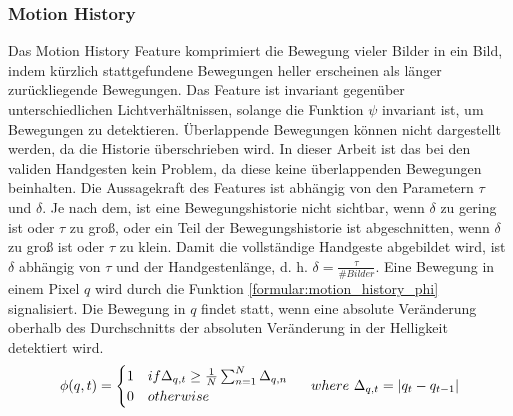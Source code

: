 \subsubsection{Motion History}
Das Motion History Feature komprimiert die Bewegung vieler Bilder in ein Bild, indem kürzlich stattgefundene Bewegungen heller erscheinen als länger zurückliegende Bewegungen. Das Feature ist invariant
gegenüber unterschiedlichen Lichtverhältnissen, solange die Funktion $\psi$ invariant ist, um Bewegungen zu detektieren. Überlappende Bewegungen können nicht dargestellt werden, da die Historie überschrieben
wird. In dieser Arbeit ist das bei den validen Handgesten kein Problem, da diese keine überlappenden Bewegungen beinhalten.
\newline
\newline
Die Aussagekraft des Features ist abhängig von den Parametern $\tau$ und $\delta$. Je nach dem, ist eine Bewegungshistorie nicht sichtbar, wenn $\delta$ zu gering ist oder $\tau$ zu groß, oder ein Teil der
Bewegungshistorie ist abgeschnitten, wenn $\delta$ zu groß ist oder $\tau$ zu klein. Damit die vollständige Handgeste abgebildet wird, ist $\delta$ abhängig von $\tau$ und der Handgestenlänge, d. h.
$\delta = \frac{\tau}{\#Bilder}$.
\newline
\newline
Eine Bewegung in einem Pixel $q$ wird durch die Funktion \ref{formular:motion_history_phi} signalisiert. Die Bewegung in $q$ findet statt, wenn eine absolute Veränderung oberhalb des Durchschnitts der
absoluten Veränderung in der Helligkeit detektiert wird.
\begin{align}
    \phi(q,t) = \begin{cases}
                    1 & if \Delta_{q,t} \geq \frac{1}{N} \sum_{n=1}^N \Delta_{q,n} \\
                    0 & otherwise
    \end{cases}
    \hspace{0.5cm}where\ \Delta_{q,t} = |q_t - q_{t-1}|
    \label{formular:motion_history_phi}
\end{align}

